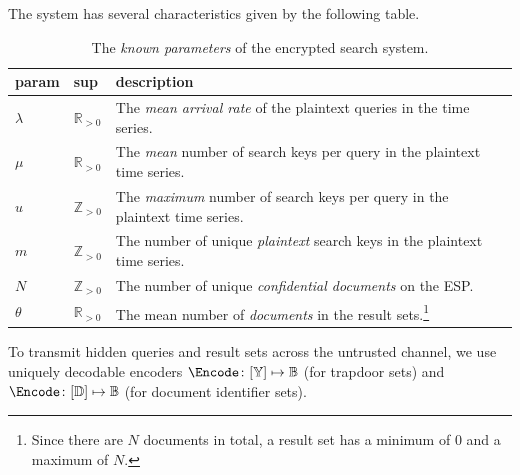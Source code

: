 \documentclass[final,11pt]{article}
\newcommand{\cisb}{\mathbb{B}}
\numberwithin{equation}{section}
\theoremstyle{plain}
\theoremstyle{remark}
\begin{document}
The system has several characteristics given by the following table.
\begin{table}[h]
    \centering
    \caption{The \emph{known parameters} of the encrypted search system.}
    \label{tbl:perf_sum}   
    \begin{tabular}{@{} l l l @{}}
        \toprule
        \textbf{param} & \textbf{sup} & \textbf{description}\\
        \midrule
        $\lambda$ & $\mathbb{R}_{>0}$ & The \emph{mean arrival rate} of the plaintext queries in the time series.\\
        $\mu$ & $\mathbb{R}_{>0}$ & The \emph{mean} number of search keys per query in the plaintext time series.\\
        $u$ & $\mathbb{Z}_{>0}$ & The \emph{maximum} number of search keys per query in the plaintext time series.\\        
        $m$ & $\mathbb{Z}_{>0}$ & The number of unique \emph{plaintext} search keys in the plaintext time series.\\
        $N$ & $\mathbb{Z}_{>0}$ & The number of unique \emph{confidential documents} on the ESP.\\
        $\theta$ & $\mathbb{R}_{>0}$ & The mean number of \emph{documents} in the result sets.\footnote{Since there are $N$ documents in total, a result set has a minimum of $0$ and a maximum of $N$.}\\
        \bottomrule
    \end{tabular}
\end{table}

To transmit hidden queries and result sets across the untrusted channel, we use uniquely decodable encoders $\Encode \colon [\mathbb{Y}] \mapsto \cisb$ (for trapdoor sets) and $\Encode \colon [\mathbb{D}] \mapsto \cisb$ (for document identifier sets).
\end{document}
